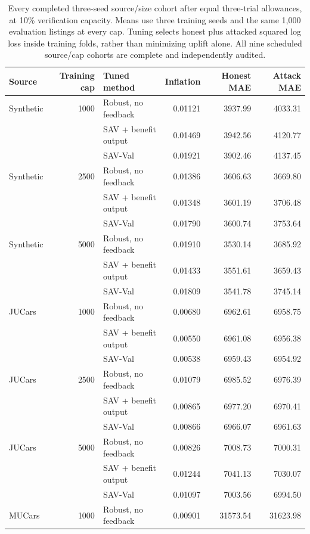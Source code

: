 \documentclass[10pt,journal]{IEEEtran}
\begin{document}
\begin{table}[t]
\centering
\caption{Every completed three-seed source/size cohort after equal three-trial allowances,
at 10\% verification capacity. Means use three training seeds and the same
1,000 evaluation listings at every cap. Tuning selects honest plus attacked
squared log loss inside training folds, rather than minimizing uplift alone.
All nine scheduled source/cap cohorts are complete and independently audited.}
\label{tab:equal_tuning_development}
\begin{tabular}{lrlrrr}
\toprule
Source & Training cap & Tuned method & Inflation & Honest MAE & Attack MAE\\
\midrule
Synthetic & 1000 & Robust, no feedback & 0.01121 & 3937.99 & 4033.31\\
 &  & SAV + benefit output & 0.01469 & 3942.56 & 4120.77\\
 &  & SAV-Val & 0.01921 & 3902.46 & 4137.45\\
\midrule
Synthetic & 2500 & Robust, no feedback & 0.01386 & 3606.63 & 3669.80\\
 &  & SAV + benefit output & 0.01348 & 3601.19 & 3706.48\\
 &  & SAV-Val & 0.01790 & 3600.74 & 3753.64\\
\midrule
Synthetic & 5000 & Robust, no feedback & 0.01910 & 3530.14 & 3685.92\\
 &  & SAV + benefit output & 0.01433 & 3551.61 & 3659.43\\
 &  & SAV-Val & 0.01809 & 3541.78 & 3745.14\\
\midrule
JUCars & 1000 & Robust, no feedback & 0.00680 & 6962.61 & 6958.75\\
 &  & SAV + benefit output & 0.00550 & 6961.08 & 6956.38\\
 &  & SAV-Val & 0.00538 & 6959.43 & 6954.92\\
\midrule
JUCars & 2500 & Robust, no feedback & 0.01079 & 6985.52 & 6976.39\\
 &  & SAV + benefit output & 0.00865 & 6977.20 & 6970.41\\
 &  & SAV-Val & 0.00866 & 6966.07 & 6961.63\\
\midrule
JUCars & 5000 & Robust, no feedback & 0.00826 & 7008.73 & 7000.31\\
 &  & SAV + benefit output & 0.01244 & 7041.13 & 7030.07\\
 &  & SAV-Val & 0.01097 & 7003.56 & 6994.50\\
\midrule
MUCars & 1000 & Robust, no feedback & 0.00901 & 31573.54 & 31623.98\\

\end{tabular}
\end{table}
\end{document}
